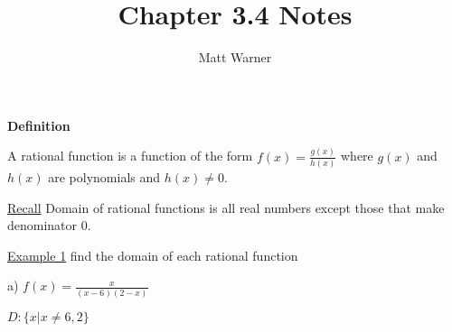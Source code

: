 \documentclass{report}
\title{\Huge{Chapter 3.4 Notes}}
\author{\huge{Matt Warner}}
\begin{document}
  \maketitle

  \begin{Large}
    \noindent \textbf{Definition}
  \end{Large}

  \bigbreak
    \noindent A rational function is a function of the form $f(x) = \frac{g(x)}{h(x)}$ where $g(x)$ and $h(x)$ are polynomials
    and $h(x)\neq{0}$. 

  \bigbreak \bigbreak
  \noindent \underline{Recall}
   Domain of rational functions is all real numbers except those that make denominator 0.

  \bigbreak \bigbreak
  \noindent \underline{Example 1}
  find the domain of each rational function
  \bigbreak
  \begin{large}
  \noindent a) $f(x) = \frac{x}{(x-6)(2-x)}$
  \end{large}
  \bigbreak
  $D: \{{x| x\neq{6,2}}\}$
  
\end{document}
